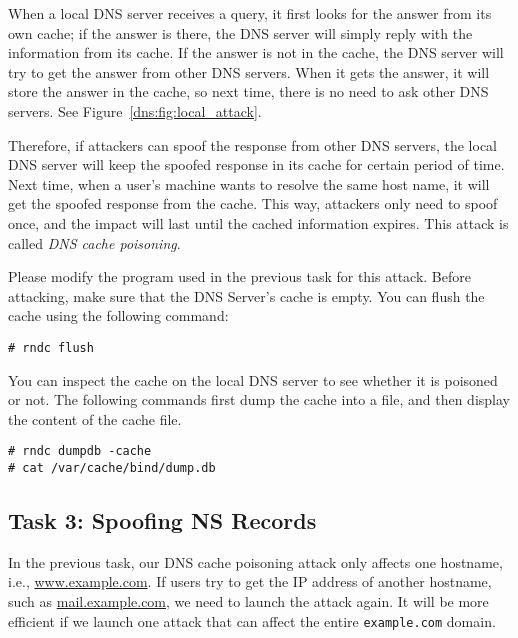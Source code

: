 When a local DNS server receives a query, 
it first looks 
for the answer from its own cache; if the answer is there, 
the DNS server will simply reply with the information from its cache. 
If the answer is not in the cache, the DNS server will 
try to get the answer from other DNS servers. When it gets the 
answer, it will store the answer in the cache, so next time, 
there is no need to ask other DNS servers. See Figure~\ref{dns:fig:local_attack}. 

Therefore, if attackers can spoof the response from other DNS 
servers, the local DNS server will keep the spoofed response in its cache for 
certain period of time. Next time, when a user's machine wants to resolve the 
same host name, it will get the spoofed response from the cache. 
This way, attackers only need to spoof once, and 
the impact will last until the cached information expires. 
This attack is called {\em DNS cache poisoning}.  


Please modify the program used in the previous task for this attack. Before attacking, 
make sure that the DNS Server's cache is empty. 
You can flush the cache using the following command:

\begin{lstlisting}
# rndc flush
\end{lstlisting}

You can inspect the cache on the local DNS server to
see whether it is poisoned or not. The following commands
first dump the cache into a file, and then
display the content of the cache file. 

\begin{lstlisting}
# rndc dumpdb -cache
# cat /var/cache/bind/dump.db
\end{lstlisting}



\subsection{Task 3: Spoofing NS Records}

In the previous task, our DNS cache poisoning attack only affects 
one hostname, i.e., \url{www.example.com}. If users try to get the IP
address of another hostname, such as \url{mail.example.com}, we 
need to launch the attack again. It will be more efficient if we launch one
attack that can affect the entire \texttt{example.com} domain.  

